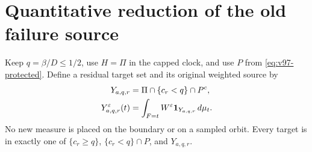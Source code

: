 \section{Quantitative reduction of the old failure source}
\label{sec:v97-reduction}
Keep $q=\beta/D\le1/2$, use $H=\Pi$ in the capped clock, and use
$P$ from \eqref{eq:v97-protected}. Define a residual target set and
its original weighted source by
\begin{align}
 Y_{a,q,r}&=\Pi\cap\{c_r<q\}\cap P^c,\notag\\
 Y_{a,q,r}^\varepsilon(t)&=\int_{F=t}W^\varepsilon
                                    \one_{Y_{a,q,r}}\,d\mu_t.
                                      \label{eq:v97-residual}
\end{align}
No new measure is placed on the boundary or on a sampled orbit.
Every target is in exactly one of $\{c_r\ge q\}$,
$\{c_r<q\}\cap P$, and $Y_{a,q,r}$.

